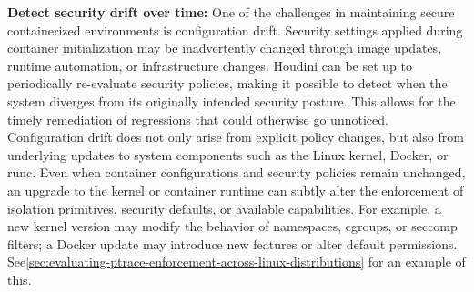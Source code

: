 \documentclass[12pt]{report}
\begin{document}
\begin{doublespace}
\noindent\textbf{Detect security drift over time:} One of the challenges in maintaining secure containerized environments is configuration drift. Security settings applied during container initialization may be inadvertently changed through image updates, runtime automation, or infrastructure changes. Houdini can be set up to periodically re-evaluate security policies, making it possible to detect when the system diverges from its originally intended security posture. This allows for the timely remediation of regressions that could otherwise go unnoticed. Configuration drift does not only arise from explicit policy changes, but also from underlying updates to system components such as the Linux kernel, Docker, or runc. Even when container configurations and security policies remain unchanged, an upgrade to the kernel or container runtime can subtly alter the enforcement of isolation primitives, security defaults, or available capabilities. For example, a new kernel version may modify the behavior of namespaces, cgroups, or seccomp filters; a Docker update may introduce new features or alter default permissions. See\ref{sec:evaluating-ptrace-enforcement-across-linux-distributions} for an example of this.
\end{doublespace} 	\fontsize{12pt}{14pt} \selectfont
\end{document}
